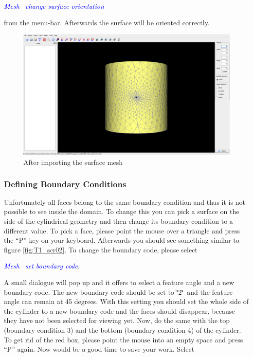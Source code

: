 \documentclass[10pt,a4paper,british]{book}
\newcommand\sqt{\char`\"{}}
\newcommand\eqt{\char`\"{}\ }
\newcommand\arr{\guillemotright\ }
\newcommand\menu[1]{\textcolor{blue}{\it \hspace{5mm} #1}}
\begin{document}
\menu{Mesh \arr change surface orientation}

from the menu-bar. Afterwards the surface will be oriented correctly.


\begin{figure}
  \begin{centering}
    \includegraphics[width=14cm]{figures/tutorials/T1/scr01}
    \par
  \end{centering}
  \caption{After importing the surface mesh}
  \label{fig:T1_scr01}
\end{figure}

\subsubsection{Defining Boundary Conditions}
Unfortunately all faces belong to the same boundary condition and thus it is not possible to see inside the domain. To change this you can pick a surface on the side of the cylindrical geometry and then change its boundary condition to a different value. To pick a face, please point the mouse over a triangle and press the {}``P'' key on your keyboard. Afterwards you should see something similar to figure \ref{fig:T1_scr02}. To change the boundary code, please select 

\menu{Mesh \arr set boundary code}. 

A small dialogue will pop up and it offers to select a feature angle and a new boundary code. The new boundary code should be set to \sqt 2\eqt and the feature angle can remain at 45 degrees. With this setting you should set the whole side of the cylinder to a new boundary code and the faces should disappear, because they have not been selected for viewing yet. Now, do the same with the top (boundary condition 3) and the bottom (boundary condition 4) of the cylinder. To get rid of the red box, please point the mouse into an empty space and press {}``P'' again. Now would be a good time to save your work. Select 
\end{document}
